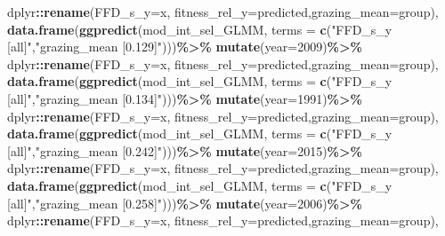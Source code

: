 \documentclass[
]{article}
\newenvironment{Shaded}{\begin{snugshade}}{\end{snugshade}}
\newcommand{\DataTypeTok}[1]{\textcolor[rgb]{0.13,0.29,0.53}{#1}}
\newcommand{\DecValTok}[1]{\textcolor[rgb]{0.00,0.00,0.81}{#1}}
\newcommand{\KeywordTok}[1]{\textcolor[rgb]{0.13,0.29,0.53}{\textbf{#1}}}
\newcommand{\NormalTok}[1]{#1}
\newcommand{\OperatorTok}[1]{\textcolor[rgb]{0.81,0.36,0.00}{\textbf{#1}}}
\newcommand{\StringTok}[1]{\textcolor[rgb]{0.31,0.60,0.02}{#1}}
\begin{document}
\begin{Shaded}
\begin{Highlighting}[]
\StringTok{      }\NormalTok{dplyr}\OperatorTok{::}\KeywordTok{rename}\NormalTok{(}\DataTypeTok{FFD\_s\_y=}\NormalTok{x, }\DataTypeTok{fitness\_rel\_y=}\NormalTok{predicted,}\DataTypeTok{grazing\_mean=}\NormalTok{group),}
    \KeywordTok{data.frame}\NormalTok{(}\KeywordTok{ggpredict}\NormalTok{(mod\_int\_sel\_GLMM,}
                         \DataTypeTok{terms =} \KeywordTok{c}\NormalTok{(}\StringTok{"FFD\_s\_y [all]"}\NormalTok{,}\StringTok{"grazing\_mean [0.129]"}\NormalTok{)))}\OperatorTok{\%\textgreater{}\%}
\StringTok{      }\KeywordTok{mutate}\NormalTok{(}\DataTypeTok{year=}\DecValTok{2009}\NormalTok{)}\OperatorTok{\%\textgreater{}\%}
\StringTok{      }\NormalTok{dplyr}\OperatorTok{::}\KeywordTok{rename}\NormalTok{(}\DataTypeTok{FFD\_s\_y=}\NormalTok{x, }\DataTypeTok{fitness\_rel\_y=}\NormalTok{predicted,}\DataTypeTok{grazing\_mean=}\NormalTok{group),}
    \KeywordTok{data.frame}\NormalTok{(}\KeywordTok{ggpredict}\NormalTok{(mod\_int\_sel\_GLMM,}
                         \DataTypeTok{terms =} \KeywordTok{c}\NormalTok{(}\StringTok{"FFD\_s\_y [all]"}\NormalTok{,}\StringTok{"grazing\_mean [0.134]"}\NormalTok{)))}\OperatorTok{\%\textgreater{}\%}
\StringTok{      }\KeywordTok{mutate}\NormalTok{(}\DataTypeTok{year=}\DecValTok{1991}\NormalTok{)}\OperatorTok{\%\textgreater{}\%}
\StringTok{      }\NormalTok{dplyr}\OperatorTok{::}\KeywordTok{rename}\NormalTok{(}\DataTypeTok{FFD\_s\_y=}\NormalTok{x, }\DataTypeTok{fitness\_rel\_y=}\NormalTok{predicted,}\DataTypeTok{grazing\_mean=}\NormalTok{group),}
    \KeywordTok{data.frame}\NormalTok{(}\KeywordTok{ggpredict}\NormalTok{(mod\_int\_sel\_GLMM,}
                         \DataTypeTok{terms =} \KeywordTok{c}\NormalTok{(}\StringTok{"FFD\_s\_y [all]"}\NormalTok{,}\StringTok{"grazing\_mean [0.242]"}\NormalTok{)))}\OperatorTok{\%\textgreater{}\%}
\StringTok{      }\KeywordTok{mutate}\NormalTok{(}\DataTypeTok{year=}\DecValTok{2015}\NormalTok{)}\OperatorTok{\%\textgreater{}\%}
\StringTok{      }\NormalTok{dplyr}\OperatorTok{::}\KeywordTok{rename}\NormalTok{(}\DataTypeTok{FFD\_s\_y=}\NormalTok{x, }\DataTypeTok{fitness\_rel\_y=}\NormalTok{predicted,}\DataTypeTok{grazing\_mean=}\NormalTok{group),}
    \KeywordTok{data.frame}\NormalTok{(}\KeywordTok{ggpredict}\NormalTok{(mod\_int\_sel\_GLMM,}
                         \DataTypeTok{terms =} \KeywordTok{c}\NormalTok{(}\StringTok{"FFD\_s\_y [all]"}\NormalTok{,}\StringTok{"grazing\_mean [0.258]"}\NormalTok{)))}\OperatorTok{\%\textgreater{}\%}
\StringTok{      }\KeywordTok{mutate}\NormalTok{(}\DataTypeTok{year=}\DecValTok{2006}\NormalTok{)}\OperatorTok{\%\textgreater{}\%}
\StringTok{      }\NormalTok{dplyr}\OperatorTok{::}\KeywordTok{rename}\NormalTok{(}\DataTypeTok{FFD\_s\_y=}\NormalTok{x, }\DataTypeTok{fitness\_rel\_y=}\NormalTok{predicted,}\DataTypeTok{grazing\_mean=}\NormalTok{group),}

\end{Highlighting}
\end{Shaded}
\end{document}
